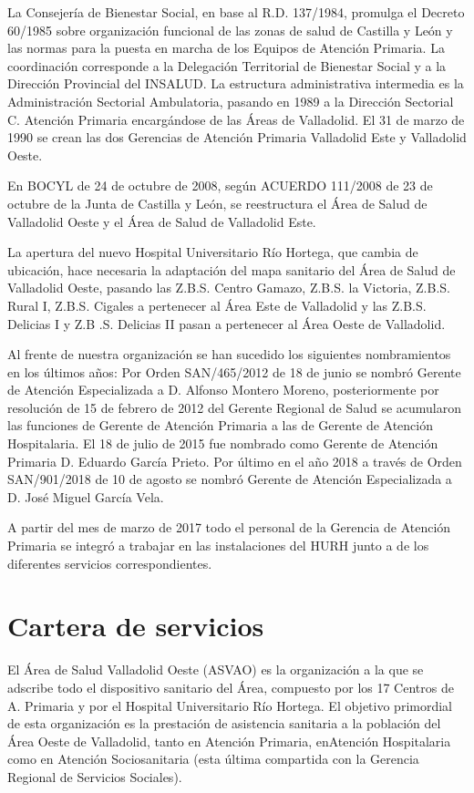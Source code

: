 La Consejería de Bienestar Social, en base al R.D. 137/1984, promulga el Decreto 60/1985 sobre organización funcional de las zonas de salud de Castilla y León y las normas para la puesta en marcha de los Equipos de Atención Primaria. La coordinación corresponde a la Delegación Territorial de Bienestar Social y a la Dirección Provincial del INSALUD. La estructura administrativa intermedia es la Administración Sectorial Ambulatoria, pasando en 1989 a la Dirección Sectorial C. Atención Primaria encargándose de las Áreas de Valladolid. El 31 de marzo de 1990 se crean las dos Gerencias de Atención Primaria Valladolid Este y Valladolid Oeste.

En BOCYL de 24 de octubre de 2008, según ACUERDO 111/2008 de 23 de octubre de la Junta de Castilla y León, se reestructura el Área de Salud de Valladolid Oeste y el Área de Salud de Valladolid Este.

La apertura del nuevo Hospital Universitario Río Hortega, que cambia de ubicación, hace necesaria la adaptación del mapa sanitario del Área de Salud de Valladolid Oeste, pasando las Z.B.S. Centro Gamazo, Z.B.S. la Victoria, Z.B.S. Rural I, Z.B.S. Cigales a pertenecer al Área Este de Valladolid y las Z.B.S. Delicias I y Z.B .S. Delicias II pasan a pertenecer al Área Oeste de Valladolid.

Al frente de nuestra organización se han sucedido los siguientes nombramientos en los últimos años: Por Orden SAN/465/2012 de 18 de junio se nombró Gerente de Atención Especializada a D. Alfonso Montero Moreno, posteriormente por resolución de 15 de febrero de 2012 del Gerente Regional de Salud se acumularon las funciones de Gerente de Atención Primaria a las de Gerente de Atención Hospitalaria. El 18 de julio de 2015 fue nombrado como Gerente de Atención Primaria D. Eduardo García Prieto. Por último en el año 2018 a través de Orden SAN/901/2018 de 10 de agosto se nombró Gerente de Atención Especializada a D. José Miguel García Vela.

A partir del mes de marzo de 2017 todo el personal de la Gerencia de Atención Primaria se integró a trabajar en las instalaciones del HURH junto a de los diferentes servicios correspondientes.

\section{Cartera de servicios}

El Área de Salud Valladolid Oeste (ASVAO) es la organización a la que se adscribe todo el dispositivo sanitario del Área, compuesto por los 17 Centros de A. Primaria y por el Hospital Universitario Río Hortega. El objetivo primordial de esta organización es la prestación de asistencia sanitaria a la población del Área Oeste de Valladolid, tanto en Atención Primaria, enAtención Hospitalaria como en Atención Sociosanitaria (esta última compartida con la Gerencia Regional de Servicios Sociales).

